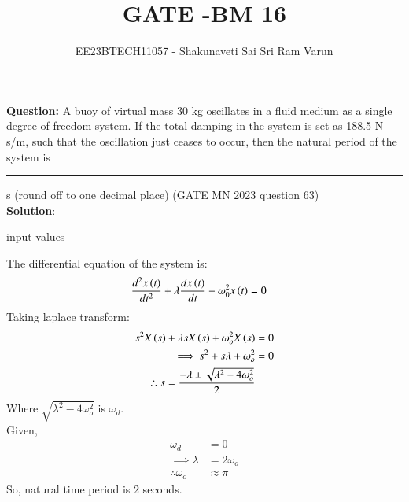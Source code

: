 \documentclass[journal,12pt,twocolumn]{IEEEtran}
\theoremstyle{remark}
\begin{document}

\vspace{3cm}

\title{GATE -BM 16}
\author{EE23BTECH11057 - Shakunaveti Sai Sri Ram Varun$^{}$%
}
\maketitle
\newpage
\bigskip
\vspace{2cm}
\textbf{Question: }
A buoy of virtual mass 30 kg oscillates in a fluid medium as a single degree of
freedom system. If the total damping in the system is set as 188.5 N-s/m, such
that the oscillation just ceases to occur, then the natural period of the system is
\rule{1cm}{0.15mm} s (round off to one decimal place)
\hfill(GATE MN 2023 question 63)\\

\textbf{Solution}:\\
\begin{table}[h!] 
\centering

\caption{input values}
\label{tab: table-bm16}
\end{table}

The differential equation of the system is:
\begin{align}
\frac{d^2x\left(t\right)}{dt^2} + \lambda \frac{dx\left(t\right)}{dt} + \omega_0^2 x\left(t\right) &= 0
\end{align}
Taking laplace transform:
\begin{align}
s^2X\left(s\right) + \lambda s X\left(s\right) + \omega_o^2 X\left(s\right)&=0\\
\implies s^2 + s\lambda + \omega_o^2 &=0\\
\therefore s = \frac{-\lambda \pm \sqrt{\lambda^2 - 4\omega_o^2}}{2}
\end{align}
Where $ \sqrt{\lambda^2 - 4\omega_o^2}$ is $ \omega_d$.\\
Given,
\begin{align}
\omega_d &=0\\
\implies \lambda &= 2\omega_o\\
\therefore \omega_o &\approx \pi
\end{align}
So, natural time period is $ 2$ seconds.
\end{document}
